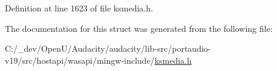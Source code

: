Definition at line 1623 of file ksmedia.\+h.



The documentation for this struct was generated from the following file\+:\begin{DoxyCompactItemize}
\item 
C\+:/\+\_\+dev/\+Open\+U/\+Audacity/audacity/lib-\/src/portaudio-\/v19/src/hostapi/wasapi/mingw-\/include/\hyperlink{ksmedia_8h}{ksmedia.\+h}\end{DoxyCompactItemize}
